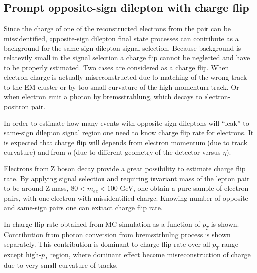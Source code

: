 \subsection{Prompt opposite-sign dilepton with charge flip}

Since the charge of one of the reconstructed electrons from the pair can be missidentified, 
opposite-sign dilepton final state processes can contribute as a background for the same-sign dilepton signal selection.
Because background is relatevily small in the signal selection a charge flip cannot be neglected and have to be properly estimated. Two cases are considered as a charge flip. When electron charge is actually misreconstructed due to matching of the wrong track to the EM cluster or by too small curvature of the high-momentum track. Or when electron emit a photon by bremsstrahlung, which decays to electron-positron pair. 

In order to estimate how many events with opposite-sign dileptons will ``leak'' to same-sign dilepton signal region one
need to know charge flip rate for electrons. It is expected that charge flip will depends from electron momentum (due to track curvature) and from $\eta$ (due to different geometry of the detector versus $\eta$).

Electrons from Z boson decay provide a great possibility to estimate charge flip rate. By applying signal selection
and requiring invariant mass of the lepton pair to be around Z mass, $80 < m_{ee} < 100$ GeV, one obtain a pure
sample of electron pairs, with one electron with missidentified charge. Knowing number of opposite- and same-sign
pairs one can extract charge flip rate.

In  charge flip rate obtained from MC simulation as a function of $p_T$ is shown.
Contribution from photon conversion from bremsstrhulng process is shown separately. This contribution is dominant 
to charge flip rate over all $p_T$ range except high-$p_T$ region, where dominant effect become misreconstruction 
of charge due to very small curvature of tracks.

